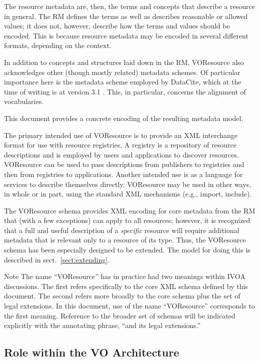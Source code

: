 \documentclass[11pt,a4paper]{ivoa}
\begin{document}
The resource metadata are, then, the terms and concepts that describe
a resource in general.  The RM defines the terms as well as describes
reasonable or allowed values; it does not, however, describe how the
terms and values should be encoded.  This is because resource metadata
may be encoded in several different formats, depending on the
context.

In addition to concepts and structures laid down in the RM, VOResource
also acknowledges other (though mostly related) metadata schemes.  Of
particular importance here is the metadata scheme employed by DataCite,
which at the time of writing is at version 3.1 \citep{std:DataCite31}.
This, in particular, concerns the alignment of vocabularies.

This document provides a concrete encoding of the resulting metadata
model.

The primary intended use of VOResource is to provide an XML interchange
format for use with resource registries.  A registry is a repository of
resource descriptions and is employed by users and applications to
discover resources.  VOResource can be used to pass descriptions from
publishers to registries and then from registries to applications.
Another intended use is as a language for services to describe themselves
directly.  VOResource may be used in other ways, in whole or in part,
using the standard XML mechanisms (e.g., import, include).  

The VOResource schema provides XML encoding for core
metadata from the RM that (with a few exceptions)
can apply to all resources; however, it is recognized that a full and
useful description of a \emph{specific} resource will require
additional metadata that is relevant only to a resource of its type.
Thus, the VOResource schema has been especially designed to be
extended.  The model for doing this is described in
sect.~\ref{sect:extending}.

\begin{admonition}{Note}
The name ``VOResource'' has in practice had two meanings within
IVOA discussions.  The first refers specifically to the core
XML schema defined by this document.  The second refers more
broadly to the core schema plus the set of legal extensions.
In this document, use of the name ``VOResource'' corresponds to
the first meaning.  Reference to the broader set of schemas
will be indicated explicitly with the annotating phrase, ``and
its legal extensions.''
\end{admonition}

\subsection{Role within the VO Architecture}
\label{sect:role}
\end{document}
